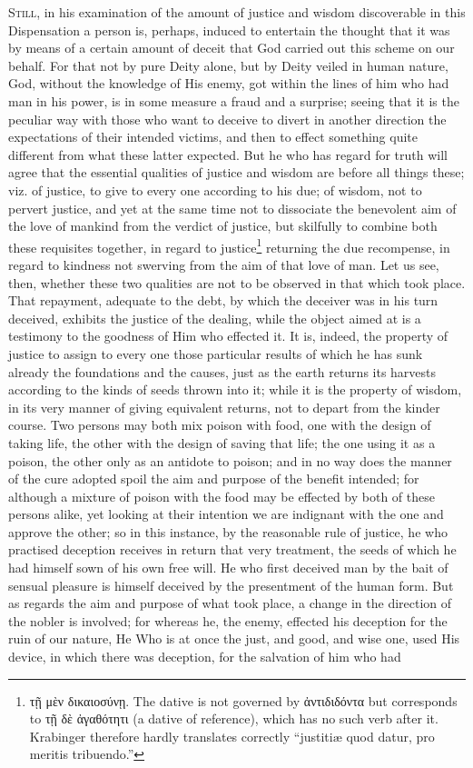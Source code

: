 
\textsc{Still}, in his examination of the amount of justice and wisdom discoverable in this Dispensation a person is, perhaps, induced to entertain the thought that it was by means of a certain amount of deceit that God carried out this scheme on our behalf. For that not by pure Deity alone, but by Deity veiled in human nature, God, without the knowledge of His enemy, got within the lines of him who had man in his power, is in some measure a fraud and a surprise; seeing that it is the peculiar way with those who want to deceive to divert in another direction the expectations of their intended victims, and then to effect something quite different from what these latter expected. But he who has regard for truth will agree that the essential qualities of justice and wisdom are before all things these; viz. of justice, to give to every one according to his due; of wisdom, not to pervert justice, and yet at the same time not to dissociate the benevolent aim of the love of mankind from the verdict of justice, but skilfully to combine both these requisites together, in regard to justice\footnote{\textgreek{τῇ μὲν δικαιοσύνῃ}. The dative is not governed by \textgreek{ἀντιδιδόντα} but corresponds to \textgreek{τῇ δὲ ἀγαθότητι} (a dative of reference), which has no such verb after it. Krabinger therefore hardly translates correctly “justitiæ quod datur, pro meritis tribuendo.”} returning the due recompense, in regard to kindness not swerving from the aim of that love of man. Let us see, then, whether these two qualities are not to be observed in that which took place. That repayment, adequate to the debt, by which the deceiver was in his turn deceived, exhibits the justice of the dealing, while the object aimed at is a testimony to the goodness of Him who effected it. It is, indeed, the property of justice to assign to every one those particular results of which he has sunk already the foundations and the causes, just as the earth returns its harvests according to the kinds of seeds thrown into it; while it is the property of wisdom, in its very manner of giving equivalent returns, not to depart from the kinder course. Two persons may both mix poison with food, one with the design of taking life, the other with the design of saving that life; the one using it as a poison, the other only as an antidote to poison; and in no way does the manner of the cure adopted spoil the aim and purpose of the benefit intended; for although a mixture of poison with the food may be effected by both of these persons alike, yet looking at their intention we are indignant with the one and approve the other; so in this instance, by the reasonable rule of justice, he who practised deception receives in return that very treatment, the seeds of which he had himself sown of his own free will. He who first deceived man by the bait of sensual pleasure is himself deceived by the presentment of the human form. But as regards the aim and purpose of what took place, a change in the direction of the nobler is involved; for whereas he, the enemy, effected his deception for the ruin of our nature, He Who is at once the just, and good, and wise one, used His device, in which there was deception, for the salvation of him who had 